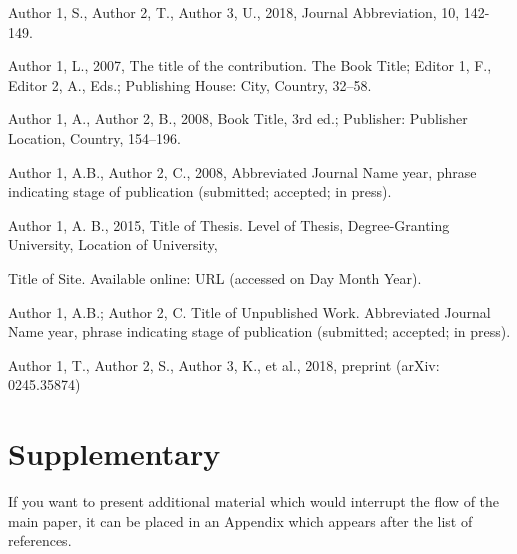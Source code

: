 \documentclass[arxiv,usenatbib]{iupartex}
\begin{document}
%
\begin{thebibliography}{}
Author 1, S., Author 2, T., Author 3, U., 2018, Journal Abbreviation, 10, 142-149. 

Author 1, L., 2007, The title of the contribution. The Book Title; Editor 1, F., Editor 2, A., Eds.; Publishing House: City, Country, 32–58.

Author 1, A., Author 2, B., 2008, Book Title, 3rd ed.; Publisher: Publisher Location, Country, 154–196.

Author 1, A.B., Author 2, C., 2008, Abbreviated Journal Name year, phrase indicating stage of publication (submitted; accepted; in press).

Author 1, A. B., 2015, Title of Thesis. Level of Thesis, Degree-Granting University, Location of University, 

Title of Site. Available online: URL (accessed on Day Month Year).

Author 1, A.B.; Author 2, C. Title of Unpublished Work. Abbreviated Journal Name year, phrase indicating stage of publication (submitted; accepted; in press).

Author 1, T., Author 2, S., Author 3, K., et al., 2018, preprint (arXiv: 0245.35874) 

\end{thebibliography}


\section*{Supplementary}
If you want to present additional material which would interrupt the ﬂow of the main paper, it can be placed in an Appendix which appears after the list of references.

\bsp	%
\label{lastpage}
\end{document}
